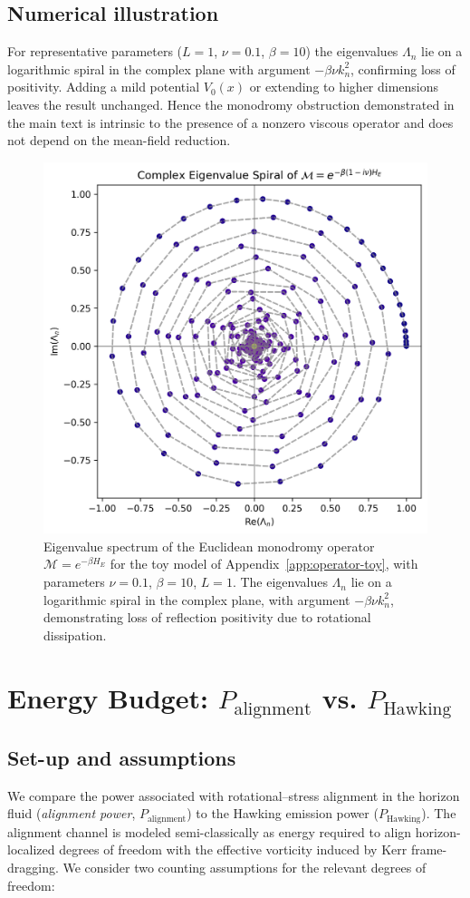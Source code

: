 \documentclass[11pt]{article}
\begin{document}
\subsection*{Numerical illustration}
For representative parameters ($L\!=\!1$, $\nu\!=\!0.1$, $\beta\!=\!10$) the eigenvalues $\Lambda_n$ lie on a logarithmic spiral in the complex plane with argument $-\beta\nu k_n^2$, confirming loss of positivity.
Adding a mild potential $V_0(x)$ or extending to higher dimensions leaves the result unchanged.
Hence the monodromy obstruction demonstrated in the main text is intrinsic to the presence of a nonzero viscous operator and does not depend on the mean-field reduction.

\begin{figure}[h!]
    \centering
    \includegraphics[width=0.6\linewidth]{monodromy_spiral.png}
    \caption{Eigenvalue spectrum of the Euclidean monodromy operator 
    $\mathcal{M} = e^{-\beta H_E}$ for the toy model of 
    Appendix~\ref{app:operator-toy}, with parameters 
    $\nu = 0.1$, $\beta = 10$, $L = 1$. 
    The eigenvalues $\Lambda_n$ lie on a logarithmic spiral 
    in the complex plane, with argument $-\beta\nu k_n^2$, 
    demonstrating loss of reflection positivity 
    due to rotational dissipation.}
    \label{fig:monodromy_spiral}
\end{figure}

\section{Energy Budget: \texorpdfstring{$P_{\text{alignment}}$}{Palignment} vs. \texorpdfstring{$P_{\text{Hawking}}$}{PHawking}}
\label{app:energy-budget}

\subsection*{Set-up and assumptions}
We compare the power associated with rotational–stress alignment in the horizon fluid
(\emph{alignment power}, $P_{\text{alignment}}$) to the Hawking emission power ($P_{\text{Hawking}}$).
The alignment channel is modeled semi-classically as energy required to align
horizon-localized degrees of freedom with the effective vorticity induced by Kerr
frame-dragging. We consider two counting assumptions for the relevant degrees of freedom:
\end{document}
